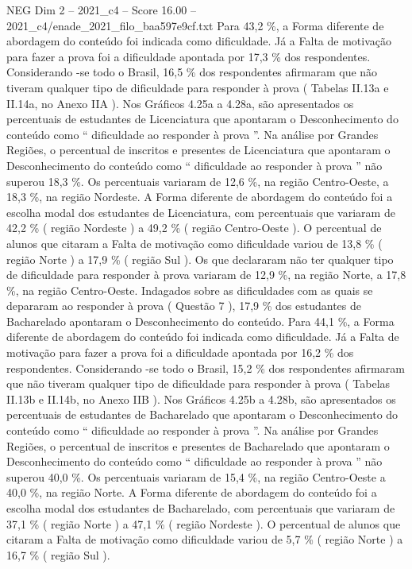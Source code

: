 \begin{textsample}{NEG Dim 2 – 2021\_c4 – Score 16.00 – 2021\_c4/enade\_2021\_filo\_baa597e9cf.txt}
Para 43,2 \%, a Forma diferente de abordagem do conteúdo foi indicada como dificuldade.
Já a Falta de motivação para fazer a prova foi a dificuldade apontada por 17,3 \% dos respondentes.
Considerando -se todo o Brasil, 16,5 \% dos respondentes afirmaram que não tiveram qualquer tipo de dificuldade para responder à prova ( Tabelas II.13a e II.14a, no Anexo IIA ).
Nos Gráficos 4.25a a 4.28a, são apresentados os percentuais de estudantes de Licenciatura que apontaram o Desconhecimento do conteúdo como “ dificuldade ao responder à prova ”.
Na análise por Grandes Regiões, o percentual de inscritos e presentes de Licenciatura que apontaram o Desconhecimento do conteúdo como “ dificuldade ao responder à prova ” não superou 18,3 \%.
Os percentuais variaram de 12,6 \%, na região Centro-Oeste, a 18,3 \%, na região Nordeste.
A Forma diferente de abordagem do conteúdo foi a escolha modal dos estudantes de Licenciatura, com percentuais que variaram de 42,2 \% ( região Nordeste ) a 49,2 \% ( região Centro-Oeste ).
O percentual de alunos que citaram a Falta de motivação como dificuldade variou de 13,8 \% ( região Norte ) a 17,9 \% ( região Sul ).
Os que declararam não ter qualquer tipo de dificuldade para responder à prova variaram de 12,9 \%, na região Norte, a 17,8 \%, na região Centro-Oeste.
Indagados sobre as dificuldades com as quais se depararam ao responder à prova ( Questão 7 ), 17,9 \% dos estudantes de Bacharelado apontaram o Desconhecimento do conteúdo.
Para 44,1 \%, a Forma diferente de abordagem do conteúdo foi indicada como dificuldade.
Já a Falta de motivação para fazer a prova foi a dificuldade apontada por 16,2 \% dos respondentes.
Considerando -se todo o Brasil, 15,2 \% dos respondentes afirmaram que não tiveram qualquer tipo de dificuldade para responder à prova ( Tabelas II.13b e II.14b, no Anexo IIB ).
Nos Gráficos 4.25b a 4.28b, são apresentados os percentuais de estudantes de Bacharelado que apontaram o Desconhecimento do conteúdo como “ dificuldade ao responder à prova ”.
Na análise por Grandes Regiões, o percentual de inscritos e presentes de Bacharelado que apontaram o Desconhecimento do conteúdo como “ dificuldade ao responder à prova ” não superou 40,0 \%.
Os percentuais variaram de 15,4 \%, na região Centro-Oeste a 40,0 \%, na região Norte.
A Forma diferente de abordagem do conteúdo foi a escolha modal dos estudantes de Bacharelado, com percentuais que variaram de 37,1 \% ( região Norte ) a 47,1 \% ( região Nordeste ).
O percentual de alunos que citaram a Falta de motivação como dificuldade variou de 5,7 \% ( região Norte ) a 16,7 \% ( região Sul ).

\end{textsample}
